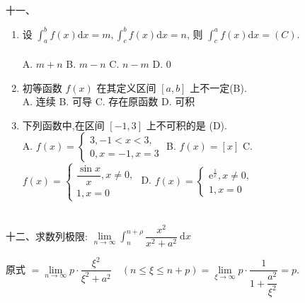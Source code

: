 \documentclass[lang=cn,newtx,10pt,scheme=chinese]{elegantbook}
\begin{document}
~\\
十一、
\begin{enumerate}
	\item 设 $\displaystyle\int_a^b f(x) \mathrm{d} x=m, \int_c^b f(x) \mathrm{d} x=n$, 则 $\displaystyle\int_c^a f(x) \mathrm{d} x=(C)$.\\
	~\\
	A. $m+n$\qquad
	B. $m-n$\qquad
	C. $n-m$\qquad
	D. 0\\
	
\item 初等函数 $f(x)$ 在其定义区间 $[a, b]$ 上不一定(B).\\
A. 连续\qquad
B. 可导\qquad
C. 存在原函数\qquad
D. 可积\\



\item 下列函数中,在区间 $[-1,3]$ 上不可积的是 (D).\\
A. $f(x)=\left\{\begin{array}{l}3,-1<x<3, \\ 0, x=-1, x=3\end{array}\right.$\quad
B. $f(x)=[x]$\quad
C. $f(x)=\left\{\begin{array}{l}\dfrac{\sin x}{x}, x \neq 0, \\ 1, x=0\end{array}\right.$\quad
D. $f(x)=\left\{\begin{array}{l}\mathrm{e}^{\frac{1}{x}}, x \neq 0, \\ 1, x=0\end{array}\right.$\\
\end{enumerate}

~\\
十二、求数列极限: $\displaystyle\lim\limits _{n \rightarrow \infty} \int_n^{n+\rho} \dfrac{x^2}{x^2+a^2} \mathrm{~d} x$\\


\begin{solution}
	原式 $=\lim\limits _{n \rightarrow \infty} p \cdot \dfrac{\xi^2}{\xi^2+a^2} \quad(n \leqslant \xi \leqslant n+p)=\lim\limits _{\xi \rightarrow \infty} p \cdot \dfrac{1}{1+\dfrac{a^2}{\xi^2}}=p.$ \\
	~\\
\end{solution}
\end{document}
